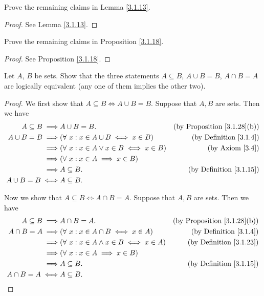 \begin{exercise}\label{ex 3.1.3}
Prove the remaining claims in Lemma \ref{3.1.13}.
\end{exercise}

\begin{proof}
See Lemma \ref{3.1.13}.
\end{proof}

\begin{exercise}\label{ex 3.1.4}
Prove the remaining claims in Proposition \ref{3.1.18}.
\end{exercise}

\begin{proof}
See Proposition \ref{3.1.18}.
\end{proof}

\begin{exercise}\label{ex 3.1.5}
Let \(A\), \(B\) be sets.
Show that the three statements \(A \subseteq B\), \(A \cup B = B\), \(A \cap B = A\) are logically equivalent (any one of them implies the other two).
\end{exercise}

\begin{proof}
We first show that \(A \subseteq B \iff A \cup B = B\).
Suppose that \(A, B\) are sets.
Then we have
\begin{align*}
A \subseteq B \implies & A \cup B = B. & \text{(by Proposition \ref{3.1.28}(b))} \\
A \cup B = B \implies & (\forall\ x : x \in A \cup B \iff x \in B) & \text{(by Definition \ref{3.1.4})} \\
\implies & (\forall\ x : x \in A \lor x \in B \iff x \in B) & \text{(by Axiom \ref{3.4})} \\
\implies & (\forall\ x : x \in A \implies x \in B) \\
\implies & A \subseteq B. & \text{(by Definition \ref{3.1.15})} \\
A \cup B = B \iff & A \subseteq B.
\end{align*}

Now we show that \(A \subseteq B \iff A \cap B = A\).
Suppose that \(A, B\) are sets.
Then we have
\begin{align*}
A \subseteq B \implies & A \cap B = A. & \text{(by Proposition \ref{3.1.28}(b))} \\
A \cap B = A \implies & (\forall\ x : x \in A \cap B \iff x \in A) & \text{(by Definition \ref{3.1.4})} \\
\implies & (\forall\ x : x \in A \land x \in B \iff x \in A) & \text{(by Definition \ref{3.1.23})} \\
\implies & (\forall\ x : x \in A \implies x \in B) \\
\implies & A \subseteq B. & \text{(by Definition \ref{3.1.15})} \\
A \cap B = A \iff & A \subseteq B.
\end{align*}
\end{proof}

